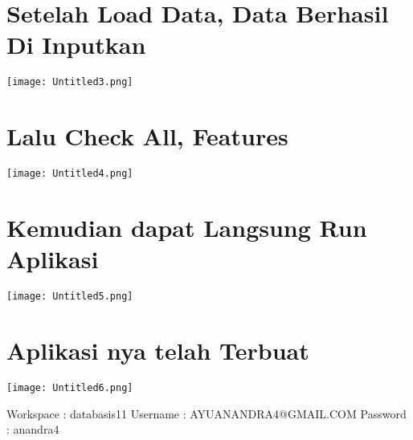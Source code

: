 \documentclass{article}
\begin{document}
\section{Setelah Load Data, Data Berhasil Di Inputkan}
\begin{center}
    \texttt{[image: Untitled3.png]}
\end{center}

\section{Lalu Check All, Features}
\begin{center}
    \texttt{[image: Untitled4.png]}
\end{center}

\section{Kemudian dapat Langsung Run Aplikasi}
\begin{center}
    \texttt{[image: Untitled5.png]}
\end{center}

\section{Aplikasi nya telah Terbuat}
\begin{center}
    \texttt{[image: Untitled6.png]}
\end{center}

Workspace : databasis11
Username : AYUANANDRA4@GMAIL.COM
Password : anandra4
\end{document}
